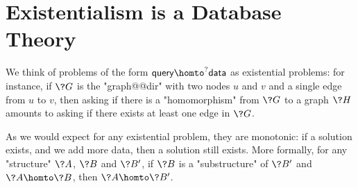 \section{Existentialism is a Database Theory}

We think of problems of the form $\textsf{query} \homto^? \textsf{data}$
as existential problems: for instance, if $\?G$ is the "graph@@dir" with
two nodes $u$ and $v$ and a single edge from $u$ to $v$,
then asking if there is a "homomorphism" from $\?G$ to a graph $\?H$ amounts
to asking if there exists at least one edge in $\?G$.

As we would expect for any existential problem, they are monotonic:
if a solution exists, and we add more data, then a solution still exists.
More formally, for any "structure" $\?A$, $\?B$ and $\?B'$, if $\?B$ is a "substructure"
of $\?B'$ and $\?A \homto \?B$,
then $\?A \homto \?B'$.

